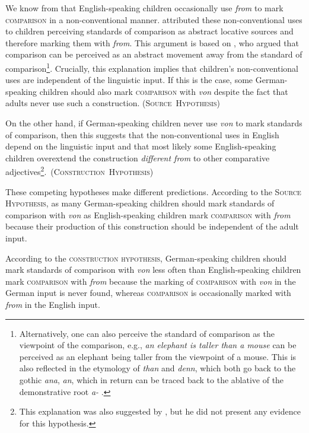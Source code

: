 \documentclass[lucida]{sp} %
\begin{document}
We know from \cite{clark1989a} that English-speaking children occasionally use \textit{from} to mark \textsc{comparison} in a non-conventional manner. \cite{clark1989a} attributed these non-conventional uses to children perceiving standards of comparison as abstract locative sources and therefore marking them with \textit{from}. This argument is based on \cite{jackendoff1983}, who argued that comparison can be perceived as an abstract movement away from the standard of comparison\footnote{Alternatively, one can also perceive the standard of comparison as the viewpoint of the comparison, e.g., \textit{an elephant is taller than a mouse} can be perceived as an elephant being taller from the viewpoint of a mouse. This is also reflected in the etymology of \textit{than} and \textit{denn}, which both go back to the gothic \textit{\textthorn ana},  \textit{\textthorn an}, which in return can be traced back to the ablative of the demonstrative root \textit{\textthorn a-} \citep{vonstuckrad1957, thurmair2001}.}. 
 Crucially, this explanation implies that children's non-conventional uses are independent of the linguistic input. If this is the case, some German-speaking children should also mark \textsc{comparison} with \textit{von} despite the fact that adults never use such a construction. \hfill (\textsc{Source~Hypothesis})

On the other hand, if German-speaking children never use \textit{von} to mark standards of comparison, then this suggests that the non-conventional uses in English depend on the linguistic input and that most likely some English-speaking children overextend the construction \textit{different from} to other comparative adjectives\footnote{This explanation was also suggested by \cite{johnson1996}, but he did not present any evidence for this hypothesis.}.{~\hfill(\textsc{Construction~Hypothesis})}

These  competing hypotheses make different predictions. According to the \textsc{Source Hypothesis}, as many German-speaking children should mark standards of comparison with \textit{von} as English-speaking children mark \textsc{comparison} with \textit{from} because their production of this construction should be independent of the adult input.

According to the \textsc{construction hypothesis}, German-speaking children should mark standards of comparison with \textit{von} less often than English-speaking children mark  \textsc{comparison} with \textit{from} because the marking of \textsc{comparison} with \textit{von} in the German input is never found, whereas \textsc{comparison} is occasionally marked with \textit{from} in the English input.
\end{document}
